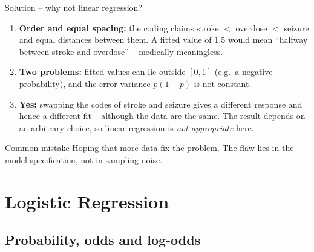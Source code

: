 \documentclass[aspectratio=169,11pt]{beamer}
\begin{document}
\begin{frame}{Solution -- why not linear regression?}
  \begin{enumerate}\setlength{\itemsep}{4pt}
    \item \textbf{Order and equal spacing:} the coding claims stroke $<$
          overdose $<$ seizure and equal distances between them. A fitted
          value of $1.5$ would mean ``halfway between stroke and overdose''
          -- medically meaningless.
    \item \textbf{Two problems:} fitted values can lie outside $[0,1]$
          (e.g.\ a negative probability), and the error variance
          $p(1-p)$ is not constant.
    \item \textbf{Yes:} swapping the codes of stroke and seizure gives a
          different response and hence a different fit -- although the data
          are the same. The result depends on an arbitrary choice, so linear
          regression is \emph{not appropriate} here.
  \end{enumerate}
  \begin{alertblock}{Common mistake}
    Hoping that more data fix the problem. The flaw lies in the model
    specification, not in sampling noise.
  \end{alertblock}
\end{frame}

\section[Logistic regression]{Logistic Regression}

\subsection{Probability, odds and log-odds}
\end{document}
